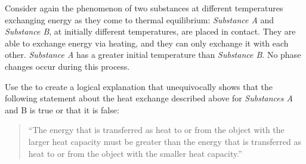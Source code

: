 \label{fnt1.2.1-1}

Consider again the phenomenon of two substances at different temperatures exchanging energy as they come to thermal equilibrium: \emph{Substance A} and \emph{Substance B}, at initially different temperatures, are placed in contact. They are able to exchange energy via heating, and they can only exchange it with each other. \emph{Substance A} has a greater initial temperature than \emph{Substance B}. No phase changes occur during this process.

Use the \EnergyInteractionModel{} to create a logical explanation that unequivocally shows that the following statement about the heat exchange described above for \emph{Substances A} and {B} is true or that it is false:

\begin{quote}
	``The energy that is transferred as heat to or from the object with the larger heat capacity must be greater than the energy that is transferred as heat to or from the object with the smaller heat capacity.''
\end{quote}